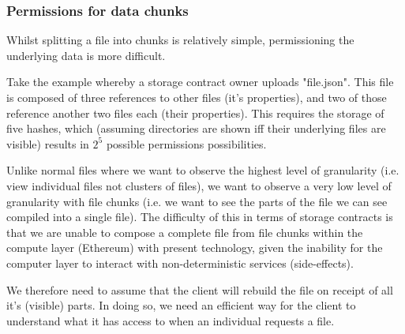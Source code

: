 \subsubsection{Permissions for data chunks}

Whilst splitting a file into chunks is relatively simple, permissioning the underlying data is more difficult.

Take the example whereby a storage contract owner uploads "file.json". This file is composed of three references to other files (it's properties), and two of those reference another two files each (their properties). This requires the storage of five hashes, which (assuming directories are shown iff their underlying files are visible) results in $2^5$ possible permissions possibilities.

Unlike normal files where we want to observe the highest level of granularity (i.e. view individual files not clusters of files), we want to observe a very low level of granularity with file chunks (i.e. we want to see the parts of the file we can see compiled into a single file). The difficulty of this in terms of storage contracts is that we are unable to compose a complete file from file chunks within the compute layer (Ethereum) with present technology, given the inability for the computer layer to interact with non-deterministic services (side-effects).

We therefore need to assume that the client will rebuild the file on receipt of all it's (visible) parts. In doing so, we need an efficient way for the client to understand what it has access to when an individual requests a file. 

